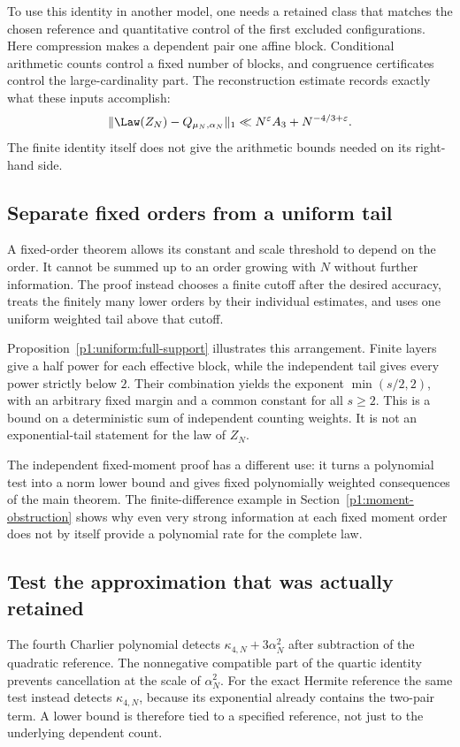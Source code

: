 To use this identity in another model, one needs a retained class
that matches the chosen reference and quantitative control of the
first excluded configurations. Here compression makes a dependent
pair one affine block. Conditional arithmetic counts control a
fixed number of blocks, and congruence certificates control the
large-cardinality part. The reconstruction estimate records exactly
what these inputs accomplish:
\[
 \|\Law(Z_N)-Q_{\mu_N,\alpha_N}\|_1
       \ll N^\varepsilon A_3+N^{-4/3+\varepsilon}.
\]
The finite identity itself does not give the arithmetic bounds
needed on its right-hand side.

\subsection{Separate fixed orders from a uniform tail}

A fixed-order theorem allows its constant and scale threshold to
depend on the order. It cannot be summed up to an order growing
with \(N\) without further information. The proof instead chooses
a finite cutoff after the desired accuracy, treats the finitely
many lower orders by their individual estimates, and uses one
uniform weighted tail above that cutoff.

Proposition~\ref{p1:uniform:full-support} illustrates this
arrangement. Finite layers give a half power for each effective
block, while the independent tail gives every power strictly below
\(2\). Their combination yields the exponent
\(\min(s/2,2)\), with an arbitrary fixed margin and a common
constant for all \(s\ge2\). This is a bound on a deterministic
sum of independent counting weights. It is not an exponential-tail
statement for the law of \(Z_N\).

The independent fixed-moment proof has a different use: it turns a
polynomial test into a norm lower bound and gives fixed polynomially
weighted consequences of the main theorem. The finite-difference
example in Section~\ref{p1:moment-obstruction} shows why even very strong information at
each fixed moment order does not by itself provide a polynomial
rate for the complete law.

\subsection{Test the approximation that was actually retained}

The fourth Charlier polynomial detects
\(\kappa_{4,N}+3\alpha_N^2\) after subtraction of the quadratic
reference. The nonnegative compatible part of the quartic identity
prevents cancellation at the scale of \(\alpha_N^2\).
For the exact Hermite reference the same test instead detects
\(\kappa_{4,N}\), because its exponential already contains the
two-pair term. A lower bound is therefore tied to a specified
reference, not just to the underlying dependent count.

